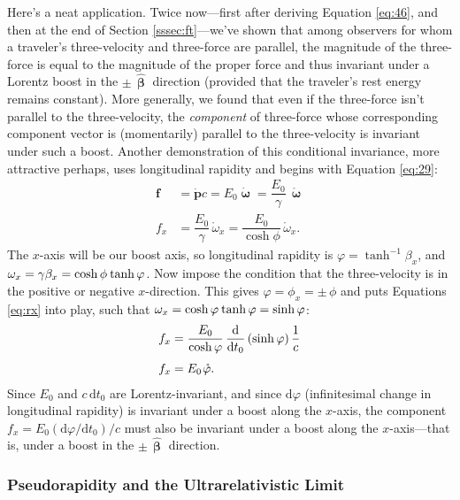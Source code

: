 \documentclass[12pt]{article}
\renewcommand{\vv}[1]{\mathbf{#1}}
\newcommand{\dd}[1]{\mathrm{d}#1}
\newcommand{\hatbeta}{\bm{\hat{\upbeta}}}
\newcommand{\vvomega}{\bm{\upomega}}
\begin{document}
Here's a neat application. Twice now---first after deriving Equation \ref{eq:46}, and then at the end of Section \ref{sssec:ft}---we've shown that among observers for whom a traveler's three-velocity and three-force are parallel, the magnitude of the three-force is equal to the magnitude of the proper force and thus invariant under a Lorentz boost in the $\pm \, \hatbeta$ direction (provided that the traveler's rest energy remains constant). More generally, we found that even if the three-force isn't parallel to the three-velocity, the \emph{component} of three-force whose corresponding component vector is (momentarily) parallel to the three-velocity is invariant under such a boost. Another demonstration of this conditional invariance, more attractive perhaps, uses longitudinal rapidity and begins with Equation \ref{eq:29}:
\begin{equation*}
\begin{split}
\vv f &= \dot{\vv p} c = E_0 \dot{\vvomega} =  \dfrac{E_0}{\gamma} \, \mathring{\vvomega} \\[3pt]
f_x & = \dfrac{E_0}{\gamma} \, \mathring{\omega}_x = \dfrac{E_0}{\cosh{\phi}} \, \mathring{\omega}_x .
\end{split}
\end{equation*}
The $x$-axis will be our boost axis, so longitudinal rapidity is $\varphi = \tanh^{-1}{\beta_x}$, and $\omega_x = \gamma \beta_x = \cosh{\phi} \mkern1mu \tanh{\varphi}$. Now impose the condition that the three-velocity is in the positive or negative $x$-direction. This gives $\varphi = \phi_x = \pm \, \phi$ and puts Equations \ref{eq:rx} into play, such that $\omega_x = \cosh{\varphi} \mkern1mu \tanh{\varphi} = \sinh{\varphi}$:
\begin{equation*}
\begin{split}
f_x &= \dfrac{E_0}{\cosh{\varphi}} \, \dfrac{\dd}{\dd t_0} \left( \sinh{\varphi} \right) \dfrac{1}{c}  \\[3pt]
f_x &= E_0 \mkern1.5mu \mathring{\varphi} .
\end{split}
\end{equation*}
Since $E_0$ and $c \, \dd t_0$ are Lorentz-invariant, and since $\dd \varphi$ (infinitesimal change in longitudinal rapidity) is invariant under a boost along the $x$-axis, the component $f_x = E_0 (\dd \varphi / \dd t_0) / c$ must also be invariant under a boost along the $x$-axis---that is, under a boost in the $\pm \, \hatbeta$ direction.


\subsubsection{Pseudorapidity and the Ultrarelativistic Limit}
\end{document}
